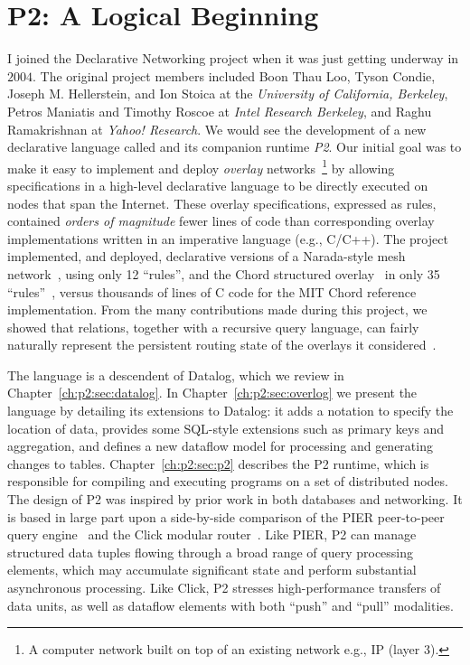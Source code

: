 \chapter[P2: A Logical Beginning]{P2: A Logical Beginning}
\label{ch:p2}

I joined the Declarative Networking project when it was just getting underway
in $2004$.  The original project members included Boon Thau Loo, Tyson Condie,
Joseph M.  Hellerstein, and Ion Stoica at the {\em University of California,
Berkeley}, Petros Maniatis and Timothy Roscoe at {\em Intel Research Berkeley},
and Raghu Ramakrishnan at {\em Yahoo!  Research}.  We would see the development
of a new declarative language called {\em \OVERLOG} and its companion runtime
{\em P2}.  Our initial goal was to make it easy to implement and deploy {\em
overlay} networks~\footnote{A computer network built on top of an existing
network e.g., IP (layer 3).} by allowing specifications in a high-level
declarative language to be directly executed on nodes that span the Internet.
These overlay specifications, expressed as \OVERLOG rules, contained {\em
orders of magnitude} fewer lines of code than corresponding overlay
implementations written in an imperative language (e.g., C/C++).  The project
implemented, and deployed, declarative versions of a Narada-style mesh
network~\cite{chu00case}, using only 12 ``rules'', and the Chord structured
overlay~\cite{chord} in only 35 ``rules''~\cite{p2:sosp}, versus thousands of
lines of C code for the MIT Chord reference implementation.  From the many
contributions made during this project, we showed that relations, together with
a recursive query language, can fairly naturally represent the persistent
routing state of the overlays it considered~\cite{boon-thesis}.

The \OVERLOG language is a descendent of Datalog, which we review in
Chapter~\ref{ch:p2:sec:datalog}.  In Chapter~\ref{ch:p2:sec:overlog} we present
the \OVERLOG language by detailing its extensions to Datalog: it adds a
notation to specify the location of data, provides some SQL-style extensions
such as primary keys and aggregation, and defines a new dataflow model for
processing and generating changes to tables.  Chapter~\ref{ch:p2:sec:p2}
describes the P2 runtime, which is responsible for compiling and executing
\OVERLOG programs on a set of distributed nodes.  The design of P2 was inspired
by prior work in both databases and networking.  It is based in large part upon
a side-by-side comparison of the PIER peer-to-peer query
engine~\cite{pier-cidr05} and the Click modular router~\cite{click-tocs}.  Like
PIER, P2 can manage structured data tuples flowing through a broad range of
query processing elements, which may accumulate significant state and perform
substantial asynchronous processing.  Like Click, P2 stresses high-performance
transfers of data units, as well as dataflow elements with both ``push'' and
``pull'' modalities.

